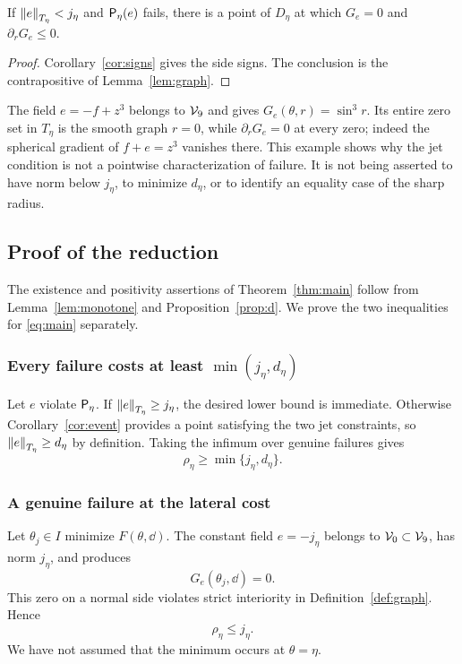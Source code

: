 \documentclass[11pt,a4paper]{article}
\begin{document}
\begin{corollary}\label{cor:event}
If $\left\lVert e\right\rVert_{T_\eta}<j_\eta$ and $\mathsf P_\eta(e)$ fails, there is a point of
$D_\eta$ at which $G_e=0$ and $\partial_rG_e\le0$.
\end{corollary}
\begin{proof}
Corollary~\ref{cor:signs} gives the side signs. The conclusion is the
contrapositive of Lemma~\ref{lem:graph}.
\end{proof}

\begin{example}\label{ex:singular}
The field $e=-f+z^3$ belongs to $\mathcal V_9$ and gives
$G_e(\theta,r)=\sin^3r$. Its entire zero set in $T_\eta$ is the
smooth graph $r=0$, while $\partial_rG_e=0$ at every zero; indeed the
spherical gradient of $f+e=z^3$ vanishes there. This example shows why the jet condition is not a
pointwise characterization of failure. It is not being asserted to have
norm below $j_\eta$, to minimize $d_\eta$, or to identify an equality
case of the sharp radius.
\end{example}

\subsection{Proof of the reduction}\label{sec:reduction}

The existence and positivity assertions of Theorem~\ref{thm:main}
follow from Lemma~\ref{lem:monotone} and Proposition~\ref{prop:d}.
We prove the two inequalities for \eqref{eq:main} separately.

\subsubsection{Every failure costs at least \texorpdfstring{$\min(j_\eta,d_\eta)$}{min(j,d)}}
Let $e$ violate $\mathsf P_\eta$. If $\left\lVert e\right\rVert_{T_\eta}\ge j_\eta$, the desired lower
bound is immediate. Otherwise Corollary~\ref{cor:event} provides a
point satisfying the two jet constraints, so $\left\lVert e\right\rVert_{T_\eta}\ge d_\eta$
by definition. Taking the infimum over genuine failures gives
\begin{equation}\label{eq:lower}
 \rho_\eta\ge\min\{j_\eta,d_\eta\}.
\end{equation}

\subsubsection{A genuine failure at the lateral cost}
Let $\theta_j\in I$ minimize $F(\theta,\dd)$. The constant field
$e=-j_\eta$ belongs to $\mathcal V_0\subset\mathcal V_9$, has norm
$j_\eta$, and produces
\[
 G_e(\theta_j,\dd)=0.
\]
This zero on a normal side violates strict interiority in
Definition~\ref{def:graph}. Hence
\begin{equation}\label{eq:upperj}
 \rho_\eta\le j_\eta.
\end{equation}
We have not assumed that the minimum occurs at $\theta=\eta$.
\end{document}
